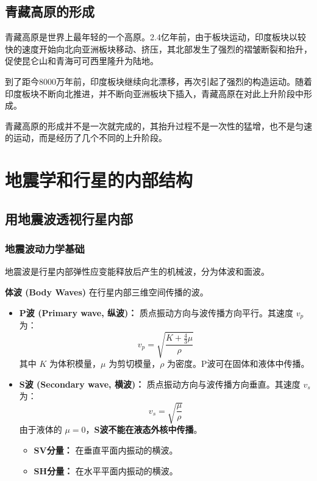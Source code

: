 \documentclass[12pt,a4paper]{article}
\begin{document}
	\subsection{青藏高原的形成}
	
	青藏高原是世界上最年轻的一个高原。2.4亿年前，由于板块运动，印度板块以较快的速度开始向北向亚洲板块移动、挤压，其北部发生了强烈的褶皱断裂和抬升，促使昆仑山和青海可可西里隆升为陆地。
	
	到了距今8000万年前，印度板块继续向北漂移，再次引起了强烈的构造运动。随着印度板块不断向北推进，并不断向亚洲板块下插入，青藏高原在对此上升阶段中形成。
	
	青藏高原的形成并不是一次就完成的，其抬升过程不是一次性的猛增，也不是匀速的运动，而是经历了几个不同的上升阶段。
	
	\section{地震学和行星的内部结构}
	
	\subsection{用地震波透视行星内部}
	\subsubsection{地震波动力学基础}
	地震波是行星内部弹性应变能释放后产生的机械波，分为体波和面波。
	
	\textbf{体波 (Body Waves)}
	在行星内部三维空间传播的波。
	\begin{itemize}
		\item \textbf{P波 (Primary wave, 纵波)：} 质点振动方向与波传播方向平行。其速度 $v_p$ 为：
		\begin{equation}
			v_p = \sqrt{\frac{K + \frac{4}{3}\mu}{\rho}}
		\end{equation}
		其中 $K$ 为体积模量，$\mu$ 为剪切模量，$\rho$ 为密度。P波可在固体和液体中传播。
		
		\item \textbf{S波 (Secondary wave, 横波)：} 质点振动方向与波传播方向垂直。其速度 $v_s$ 为：
		\begin{equation}
			v_s = \sqrt{\frac{\mu}{\rho}}
		\end{equation}
		由于液体的 $\mu = 0$，\textbf{S波不能在液态外核中传播}。
		\begin{itemize}
			\item \textbf{SV分量：} 在垂直平面内振动的横波。
			\item \textbf{SH分量：} 在水平平面内振动的横波。
		\end{itemize}
	\end{itemize}
	
\end{document}
